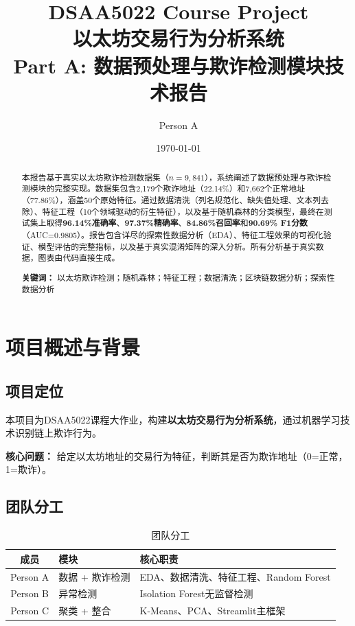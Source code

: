 \documentclass[12pt,a4paper]{article}
\title{\textbf{DSAA5022 Course Project} \\ \vspace{0.5em} \Large 以太坊交易行为分析系统 \\ \vspace{0.3em} \large Part A: 数据预处理与欺诈检测模块技术报告}
\author{Person A}
\date{\today}
\begin{document}
\maketitle

\begin{abstract}
本报告基于真实以太坊欺诈检测数据集（$n=9{,}841$），系统阐述了数据预处理与欺诈检测模块的完整实现。数据集包含2{,}179个欺诈地址（22.14\%）和7{,}662个正常地址（77.86\%），涵盖50个原始特征。通过数据清洗（列名规范化、缺失值处理、文本列去除）、特征工程（10个领域驱动的衍生特征），以及基于随机森林的分类模型，最终在测试集上取得\textbf{96.14\%准确率}、\textbf{97.37\%精确率}、\textbf{84.86\%召回率}和\textbf{90.69\% F1分数}（AUC=0.9805）。报告包含详尽的探索性数据分析（EDA）、特征工程效果的可视化验证、模型评估的完整指标，以及基于真实混淆矩阵的深入分析。所有分析基于真实数据，图表由代码直接生成。

\textbf{关键词：} 以太坊欺诈检测；随机森林；特征工程；数据清洗；区块链数据分析；探索性数据分析
\end{abstract}

\tableofcontents
\newpage

\section{项目概述与背景}

\subsection{项目定位}

本项目为DSAA5022课程大作业，构建\textbf{以太坊交易行为分析系统}，通过机器学习技术识别链上欺诈行为。

\textbf{核心问题：} 给定以太坊地址的交易行为特征，判断其是否为欺诈地址（0=正常，1=欺诈）。

\subsection{团队分工}

\begin{table}[H]
\centering
\caption{团队分工}
\begin{tabular}{@{}clp{5.5cm}@{}}
\toprule
\textbf{成员} & \textbf{模块} & \textbf{核心职责} \\
\midrule
Person A & 数据 + 欺诈检测 & EDA、数据清洗、特征工程、Random Forest \\
Person B & 异常检测 & Isolation Forest无监督检测 \\
Person C & 聚类 + 整合 & K-Means、PCA、Streamlit主框架 \\
\bottomrule
\end{tabular}
\end{table}
\end{document}
